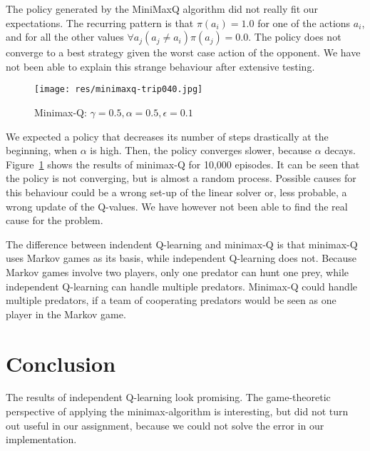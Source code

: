 \documentclass{article}
\begin{document}
The policy generated by the MiniMaxQ algorithm did not really fit our expectations. The recurring pattern is that $\pi(a_i) = 1.0$ for one of the actions $a_i$, and for all the other values $\forall a_j (a_j \neq a_i) \pi(a_j) = 0.0$. The policy does not converge to a best strategy given the worst case action of the opponent. We have not been able to explain this strange behaviour after extensive testing. 

\begin{figure}[!h]
\texttt{[image: res/minimaxq-trip040.jpg]}
\caption{Minimax-Q: $\gamma=0.5, \alpha = 0.5, \epsilon = 0.1$}
\label{fig:minimaxq}
\end{figure}

We expected a policy that decreases its number of steps drastically at the beginning, when $\alpha$ is high. Then, the policy converges slower, because $\alpha$ decays. Figure~\ref{fig:minimaxq} shows the results of minimax-Q for 10,000 episodes. It can be seen that the policy is not converging, but is almost a random process. Possible causes for this behaviour could be a wrong set-up of the linear solver or, less probable, a wrong update of the Q-values. We have however not been able to find the real cause for the problem. %

The difference between indendent Q-learning and minimax-Q is that minimax-Q uses Markov games as its basis, while independent Q-learning does not. Because Markov games involve two players, only one predator can hunt one prey, while independent Q-learning can handle multiple predators. Minimax-Q could handle multiple predators, if a team of cooperating predators would be seen as one player in the Markov game.
\section{Conclusion}
The results of independent Q-learning look promising. The game-theoretic perspective of applying the minimax-algorithm is interesting, but did not turn out useful in our assignment, because we could not solve the error in our implementation.
\end{document}
